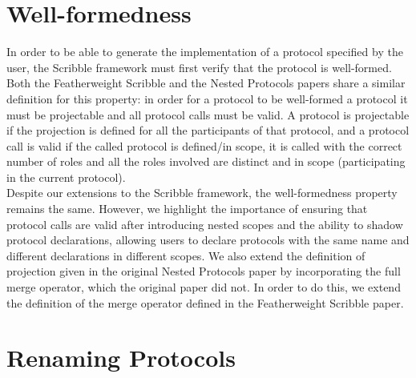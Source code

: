 \documentclass[12pt,twoside]{report}
\begin{document}
\section{Well-formedness}
In order to be able to generate the implementation of a protocol specified by the user, the Scribble framework must first verify that the protocol is well-formed.\\ Both the Featherweight Scribble \cite{featherweight} and the Nested Protocols\cite{nestedprotocols} papers share a similar definition for this property: in order for a protocol to be well-formed a protocol it must be projectable and all protocol calls must be valid. A protocol is projectable if the projection is defined for all the participants of that protocol, and a protocol call is valid if the called protocol is defined/in scope, it is called with the correct number of roles and all the roles involved are distinct and in scope (participating in the current protocol).\\

Despite our extensions to the Scribble framework, the well-formedness property remains the same. However, we highlight the importance of ensuring that protocol calls are valid after introducing nested scopes and the ability to shadow protocol declarations, allowing users to declare protocols with the same name and different declarations in different scopes. We also extend the definition of projection given in the original Nested Protocols paper\cite{nestedprotocols} by incorporating the full merge operator, which the original paper did not. In order to do this, we extend the definition of the merge operator defined in the Featherweight Scribble paper\cite{featherweight}.


\section{Renaming Protocols}\label{renaming}
\end{document}
